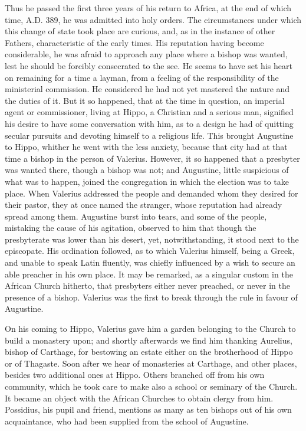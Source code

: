 Thus he passed the first three years of his return to Africa, at
the end of which time, A.D. 389, he was admitted
into holy orders. The circumstances under which this change of state
took place are curious, and, as in the instance of other Fathers,
characteristic of the early times. His reputation having become
considerable, he was afraid to approach any place where a bishop was
wanted, lest he should be forcibly consecrated to the see. He seems to
have set his heart on remaining for a time a layman, from a feeling of
the responsibility of the ministerial commission. He considered he had
not yet mastered the nature and the duties of it. But it so happened,
that at the time in question, an imperial agent or commissioner,
living at Hippo, a Christian and a serious man, signified his desire
to have some conversation with him, as to a design he had of quitting
secular pursuits and devoting himself to a religious life. This
brought Augustine to Hippo, whither he went with the less anxiety,
because that city had at that time a bishop in the person of Valerius.
However, it so happened that a presbyter was wanted there, though a
bishop was not; and Augustine, little suspicious of what was to
happen, joined the congregation in which the election was to take
place. When Valerius addressed the people and demanded whom they
desired for their pastor, they at once named the stranger, whose
reputation had already spread among them. Augustine burst into tears,
and some of the people, mistaking the cause of his agitation, observed
to him that though the presbyterate was lower than his desert, yet,
notwithstanding, it stood next to the episcopate. His ordination
followed, as to which Valerius himself, being a Greek, and unable to
speak Latin fluently, was chiefly influenced by a wish to secure
an able preacher in his own place. It may be remarked, as a singular
custom in the African Church hitherto, that presbyters either never
preached, or never in the presence of a bishop. Valerius was the first
to break through the rule in favour of Augustine.

On his coming to Hippo, Valerius gave him a garden belonging to the
Church to build a monastery upon; and shortly afterwards we find him
thanking Aurelius, bishop of Carthage, for bestowing an estate either
on the brotherhood of Hippo or of Thagaste. Soon after we hear of
monasteries at Carthage, and other places, besides two additional ones
at Hippo. Others branched off from his own community, which he took
care to make also a school or seminary of the Church. It became an
object with the African Churches to obtain clergy from him. Possidius,
his pupil and friend, mentions as many as ten bishops out of his own
acquaintance, who had been supplied from the school of Augustine.


